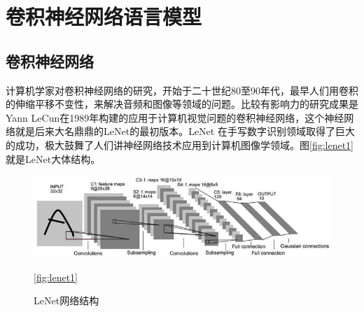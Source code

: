 \documentclass[twoside,a4paper,12pt]{book}%
\begin{document}
 \section{卷积神经网络语言模型}
 \subsection{卷积神经网络}
 计算机学家对卷积神经网络的研究，开始于二十世纪80至90年代，最早人们用卷积的伸缩平移不变性，来解决音频和图像等领域的问题。比较有影响力的研究成果是Yann LeCun在1989年构建的应用于计算机视觉问题的卷积神经网络，这个神经网络就是后来大名鼎鼎的LeNet的最初版本。LeNet 在手写数字识别领域取得了巨大的成功，极大鼓舞了人们讲神经网络技术应用到计算机图像学领域。图\ref{fig:lenet1}就是LeNet大体结构。
\begin{figure}[htbp]
\begin{center}
\includegraphics[width=5.5in]{figures/lenet1.jpg}
\caption{LeNet网络结构}\ref{fig:lenet1}
\end{center}
\end{figure}
\end{document}
